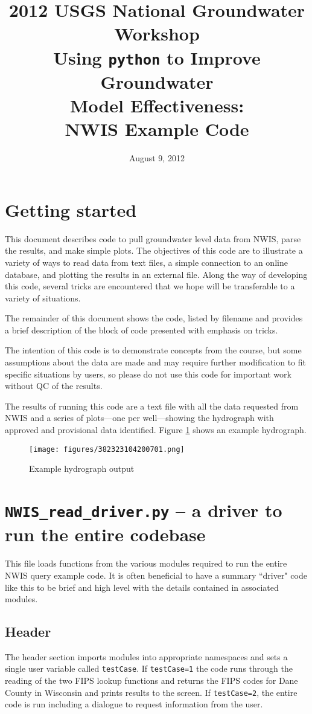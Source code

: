 \documentclass[12pt]{article}
\title{2012 USGS National Groundwater Workshop \\ Using \texttt{python} to Improve Groundwater \\ Model Effectiveness: \\ NWIS Example Code}
\author{}
\date{August 9, 2012}
\begin{document}
\maketitle

\section{Getting started}
This document describes code to pull groundwater level data from NWIS, parse the results, and make simple plots. The objectives of this code are to illustrate a variety of ways to read data from text files, a simple connection to an online database, and plotting the results in an external file. Along the way of developing this code, several tricks are encountered that we hope will be transferable to a variety of situations. 

The remainder of this document shows the code, listed by filename and provides a brief description of the block of code presented with emphasis on tricks.

The intention of this code is to demonstrate concepts from the course, but some assumptions about the data are made and may require further modification to fit specific situations by users, so please do not use this code for important work without QC of the results.

The results of running this code are a text file with all the data requested from NWIS and a series of plots---one per well---showing the hydrograph with approved and provisional data identified. Figure \ref{FigHydro} shows an example hydrograph.
\begin{figure}
	\centering
  	\texttt{[image: figures/382323104200701.png]}
 	\caption{Example hydrograph output}
	\label{FigHydro}
\end{figure}
\section{\texttt{NWIS\_read\_driver.py} -- a driver to run the entire codebase}
This file loads functions from the various modules required to run the entire NWIS query example code. It is often beneficial to have a summary ``driver" code like this to be brief and high level with the details contained in associated modules.
\subsection{Header}
The header section imports modules into appropriate namespaces and sets a single user variable called \texttt{testCase}. If \texttt{testCase=1} the code runs through the reading of the two FIPS lookup functions and returns the FIPS codes for Dane County in Wisconsin and prints results to the screen. If \texttt{testCase=2}, the entire code is run including a dialogue to request information from the user.  
\begin{center}
	
\end{center}
\end{document}
